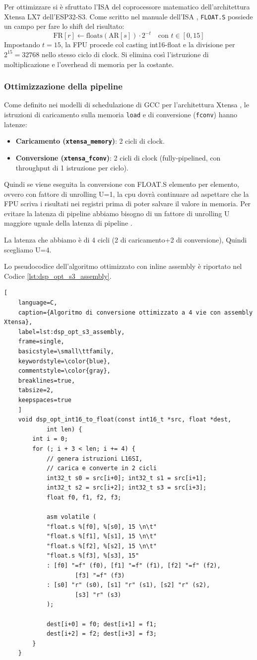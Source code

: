 Per ottimizzare si è sfruttato l'ISA del coprocessore matematico dell'architettura Xtensa LX7 dell'ESP32-S3. Come scritto nel manuale dell'ISA \cite{xtensa_isa},
 \texttt{FLOAT.S} possiede un campo per fare lo shift del risultato:
\begin{equation}
	\text{FR}[r] \leftarrow \text{floats}(\text{AR}[s]) \cdot 2^{-t} \quad \text{con } t \in [0, 15]
\end{equation}
Impostando $t = 15$, la FPU procede col casting int16-float e la divisione per $2^{15} = 32768$ nello stesso ciclo di clock. Si
elimina così l'istruzione di moltiplicazione e l'overhead di memoria per la costante.

\subsubsection{Ottimizzazione della pipeline}
Come definito nei modelli di schedulazione di GCC per l'architettura
Xtensa \cite{gcc_xtensa}, le istruzioni di caricamento sulla memoria \texttt{load} e di conversione (\texttt{fconv}) hanno latenze:
\begin{itemize}
	\item \textbf{Caricamento (\texttt{xtensa\_memory})}: 2 cicli di clock.
	\item \textbf{Conversione (\texttt{xtensa\_fconv})}: 2 cicli di clock (fully-pipelined, con throughput di 1 istruzione per ciclo).
\end{itemize}
Quindi se viene eseguita la conversione con FLOAT.S elemento per elemento, ovvero con fattore di unrolling U=1, la cpu dovrà continuare ad aspettare che la FPU scriva i risultati nei registri prima di poter salvare il valore in memoria.
Per evitare la latenza di pipeline abbiamo bisogno di un fattore di unrolling U maggiore uguale della latenza di pipeline \cite{patterson_hennessy}.

La latenza che abbiamo è di 4 cicli (2 di caricamento+2 di conversione), Quindi scegliamo U=4.


Lo pseudocodice dell'algoritmo ottimizzato con inline assembly è riportato nel Codice \ref{lst:dsp_opt_s3_assembly}.
\begin{lstlisting}[
	language=C,
	caption={Algoritmo di conversione ottimizzato a 4 vie con assembly Xtensa},
	label=lst:dsp_opt_s3_assembly,
	frame=single,
	basicstyle=\small\ttfamily,
	keywordstyle=\color{blue},
	commentstyle=\color{gray},
	breaklines=true,
	tabsize=2,
	keepspaces=true
	]
	void dsp_opt_int16_to_float(const int16_t *src, float *dest,
			int len) {
		int i = 0;
		for (; i + 3 < len; i += 4) {
			// genera istruzioni L16SI,
			// carica e converte in 2 cicli
			int32_t s0 = src[i+0]; int32_t s1 = src[i+1];
			int32_t s2 = src[i+2]; int32_t s3 = src[i+3];
			float f0, f1, f2, f3;

			asm volatile (
			"float.s %[f0], %[s0], 15 \n\t"
			"float.s %[f1], %[s1], 15 \n\t"
			"float.s %[f2], %[s2], 15 \n\t"
			"float.s %[f3], %[s3], 15"
			: [f0] "=f" (f0), [f1] "=f" (f1), [f2] "=f" (f2),
					[f3] "=f" (f3)
			: [s0] "r" (s0), [s1] "r" (s1), [s2] "r" (s2),
					[s3] "r" (s3)
			);

			dest[i+0] = f0; dest[i+1] = f1;
			dest[i+2] = f2; dest[i+3] = f3;
		}
	}
\end{lstlisting}

